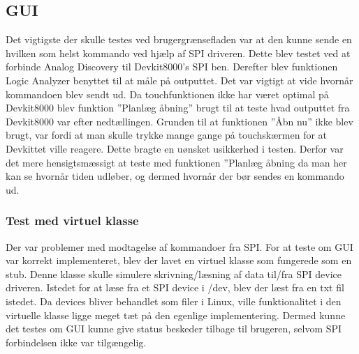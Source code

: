 \subsection{GUI}
Det vigtigste der skulle testes ved brugergrænsefladen var at den kunne sende en hvilken som helst kommando ved hjælp af SPI driveren. Dette blev testet ved at 
forbinde Analog Discovery til Devkit8000’s SPI ben. Derefter blev funktionen Logic Analyzer benyttet til at måle på outputtet. Det var vigtigt at vide hvornår 
kommandoen blev sendt ud. Da touchfunktionen ikke har været optimal på Devkit8000 blev funktion ”Planlæg åbning” brugt til at teste hvad outputtet fra Devkit8000
 var efter nedtællingen. Grunden til at funktionen ”Åbn nu” ikke blev brugt, var fordi at man skulle trykke mange gange på touchskærmen for at Devkittet ville 
 reagere. Dette bragte en uønsket usikkerhed i testen. Derfor var det mere hensigtsmæssigt at teste med funktionen ”Planlæg åbning da man her kan se hvornår 
 tiden udløber, og dermed hvornår der bør sendes en kommando ud. 

\subsubsection{Test med virtuel klasse}
Der var problemer med modtagelse af kommandoer fra SPI. For at teste om GUI var korrekt implementeret, blev der lavet en virtuel klasse som fungerede som en 
stub. Denne klasse skulle simulere skrivning/læsning af data til/fra SPI device driveren. Istedet for at læse fra et SPI device i /dev, blev der læst fra en txt 
fil istedet. Da devices bliver behandlet som filer i Linux, ville funktionalitet i den virtuelle klasse ligge meget tæt på den egenlige implementering. Dermed 
kunne det testes om GUI kunne give status beskeder tilbage til brugeren, selvom SPI forbindelsen ikke var tilgængelig. 